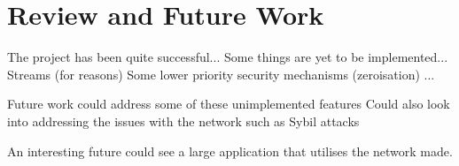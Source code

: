 \section{Review and Future Work}
	The project has been quite successful...
	Some things are yet to be implemented...
		Streams (for reasons)
		Some lower priority security mechanisms (zeroisation)
	...
	
	Future work could address some of these unimplemented features
	Could also look into addressing the issues with the network such as Sybil attacks
	
	An interesting future could see a large application that utilises the network made.